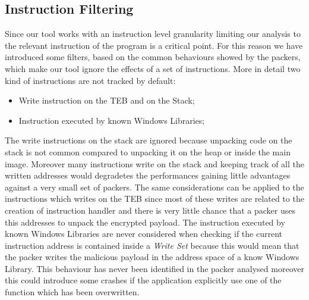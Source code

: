 \subsection{Instruction Filtering}
Since our tool works with an instruction level granularity limiting our analysis to the relevant instruction of the program is a critical point. For this reason we have introduced some filters, based on the common behaviours showed by the packers, which make our tool ignore the effects of a set of instructions. More in detail two kind of instructions are not tracked by default:
\begin{itemize}
	\item Write instruction on the TEB and on the Stack;
	\item Instruction executed by known Windows Libraries;
\end{itemize}
 The write instructions on the stack are ignored because unpacking code on the stack is not common compared to unpacking it on the heap or inside the main image. Moreover many instructions write on the stack and keeping track of all the written addresses would degradetes the performances gaining little advantages against a very small set of packers. The same considerations can be applied to the instructions which writes on the TEB since most of these writes are related to the creation of instruction handler and there is very little chance that a packer uses this addresses to unpack the encrypted payload.
The instruction executed by known Windows Libraries are never considered when checking if the current instruction address is contained inside a \textit{Write Set } because this would mean that the packer writes the malicious payload in the address space of a know Windows Library. This behaviour has never been identified in the packer analysed moreover this could introduce some crashes if the application explicitly use one of the function which has been overwritten.


